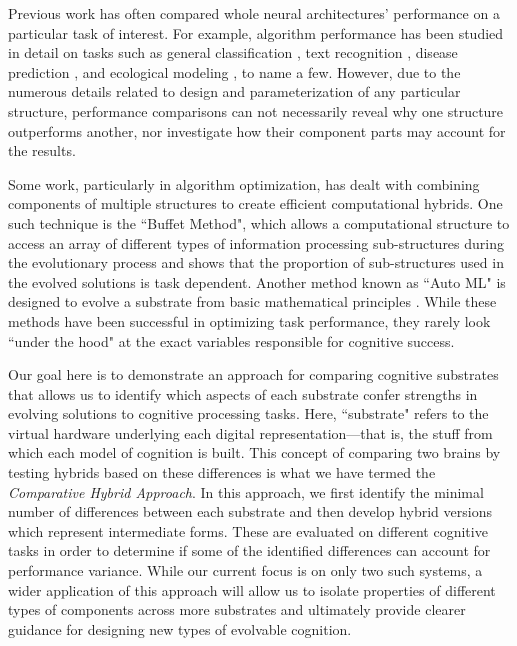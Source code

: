 Previous work has often compared whole neural architectures' performance on a particular task of interest.
For example, algorithm performance has been studied in detail on tasks such as general classification \citep{williams_preliminary_2006,singh_review_2016, binkhonain_review_2019}, text recognition \citep{khan_review_2019}, disease prediction \citep{uddin_comparing_2019}, and ecological modeling \citep{crisci_review_2012}, to name a few.
However, due to the numerous details related to design and parameterization of any particular structure, performance comparisons can not necessarily reveal why one structure outperforms another, nor investigate how their component parts may account for the results. 

Some work, particularly in algorithm optimization, has dealt with combining components of multiple structures to create efficient computational hybrids.
One such technique is the ``Buffet Method", which allows a computational structure to access an array of different types of information processing sub-structures during the evolutionary process\citep{hintze_evolutionary_2019} and shows that the proportion of sub-structures used in the evolved solutions is task dependent. 
Another method known as ``Auto ML" is designed to evolve a substrate from basic mathematical principles \citep{real_automl-zero_2020}. 
While these methods have been successful in optimizing task performance, they rarely look ``under the hood" at the exact variables responsible for cognitive success.

Our goal here is to demonstrate an approach for comparing cognitive substrates that allows us to identify which aspects of each substrate confer strengths in evolving solutions to cognitive processing tasks.
Here, ``substrate" refers to the virtual hardware underlying each digital representation---that is, the stuff from which each model of cognition is built. 
This concept of comparing two brains by testing hybrids based on these differences is what we have termed the \textit{Comparative Hybrid Approach}. 
In this approach, we first identify the minimal number of differences between each substrate and then develop hybrid versions which represent intermediate forms. 
These are evaluated on different cognitive tasks in order to determine if some of the identified differences can account for performance variance.
While our current focus is on only two such systems, a wider application of this approach will allow us to isolate properties of different types of components across more substrates and ultimately provide clearer guidance for designing new types of evolvable cognition.

